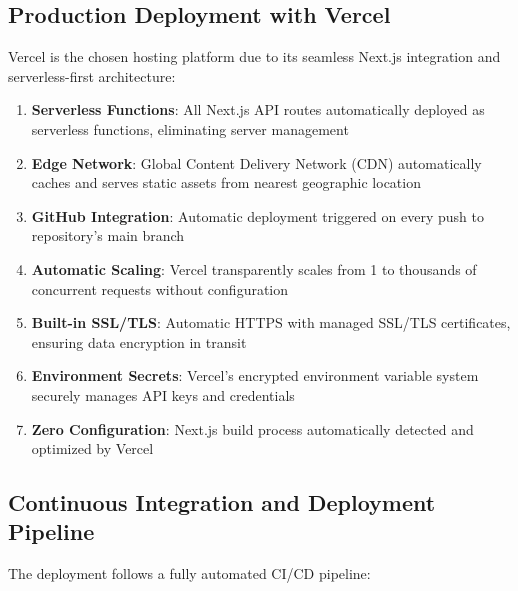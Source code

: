 \documentclass[12pt,a4paper]{report}
\begin{document}
\subsection{Production Deployment with Vercel}

Vercel is the chosen hosting platform due to its seamless Next.js integration and serverless-first architecture:

\begin{enumerate}[label=\roman*)]
    \item \textbf{Serverless Functions}: All Next.js API routes automatically deployed as serverless functions, eliminating server management
    \item \textbf{Edge Network}: Global Content Delivery Network (CDN) automatically caches and serves static assets from nearest geographic location
    \item \textbf{GitHub Integration}: Automatic deployment triggered on every push to repository's main branch
    \item \textbf{Automatic Scaling}: Vercel transparently scales from 1 to thousands of concurrent requests without configuration
    \item \textbf{Built-in SSL/TLS}: Automatic HTTPS with managed SSL/TLS certificates, ensuring data encryption in transit
    \item \textbf{Environment Secrets}: Vercel's encrypted environment variable system securely manages API keys and credentials
    \item \textbf{Zero Configuration}: Next.js build process automatically detected and optimized by Vercel
\end{enumerate}

\subsection{Continuous Integration and Deployment Pipeline}

The deployment follows a fully automated CI/CD pipeline:
\end{document}
